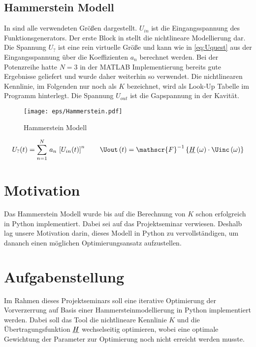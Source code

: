 \documentclass[../Report.tex]{subfiles}
\begin{document}
\subsection{Hammerstein Modell}
\label{subsec:einf.modell_BB.hammerstein}
In  sind alle verwendeten Größen dargestellt. $U_{in}$ ist die Eingangsspannung des Funktionsgenerators. Der erste Block in  stellt die nichtlineare Modellierung dar. Die Spannung $U_{?}$ ist eine rein virtuelle Größe und kann wie in \eqref{eq:Uquest} aus der Eingangsspannung über die Koeffizienten $a_n$ berechnet werden. Bei der Potenzreihe hatte $N = 3$ in der MATLAB Implementierung bereits gute Ergebnisse geliefert und wurde daher weiterhin so verwendet. Die nichtlinearen Kennlinie, im Folgenden nur noch als $K$ bezeichnet, wird als Look-Up Tabelle im Programm hinterlegt. Die Spannung $U_{out}$ ist die Gapspannung in der Kavität.
\begin{figure}[H]
	\centering
	\texttt{[image: eps/Hammerstein.pdf]}
	\caption{Hammerstein Modell}
  	\label{fig:Hammerstein}
\end{figure}
\begin{align}
	U_?(t)=\sum_{n=1}^N \, a_n \, \left[ U_{in}(t) \right]^n
	\label{eq:Uquest}
	\qquad
	\Uout \oft = \mathscr{F}^{-1} \left\{ \Hcompl \ofomega \cdot \Uinc \ofomega \right\}
\end{align}

\section{Motivation}
\label{sec:einf.motivation}
Das Hammerstein Modell wurde bis auf die Berechnung von $K$ schon erfolgreich in Python implementiert. Dabei sei auf das Projektseminar \cite{PJS_Denys} verwiesen. Deshalb lag unsere Motivation darin, dieses Modell in Python zu vervollständigen, um dananch einen möglichen Optimierungsansatz aufzustellen.


\section{Aufgabenstellung}
\label{sec:einf.aufgabe}
Im Rahmen dieses Projektseminars soll eine iterative Optimierung der Vorverzerrung auf Basis einer Hammersteinmodellierung in Python implementiert werden. Dabei soll das Tool die nichtlineare Kennlinie $K$ und die Übertragungsfunktion $\underline{H}$ wechselseitig optimieren, wobei eine optimale Gewichtung der Parameter zur Optimierung noch nicht erreicht werden musste.
\end{document}

